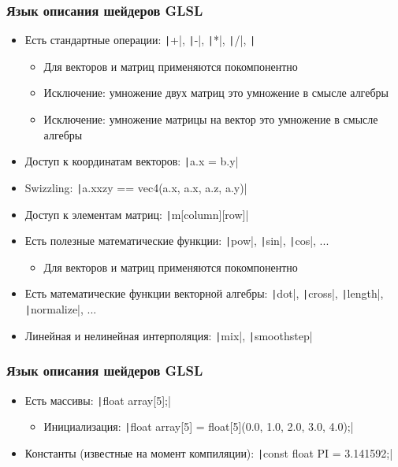 \documentclass[10pt]{beamer}
\begin{document}
\begin{frame}[fragile]
\frametitle{Язык описания шейдеров GLSL}
\begin{itemize}
\item Есть стандартные операции: \texttt|+|, \texttt|-|, \texttt|*|, \texttt|/|, \texttt|%
\pause
\begin{itemize}
\item Для векторов и матриц применяются покомпонентно
\pause
\item Исключение: умножение двух матриц это умножение в смысле алгебры
\pause
\item Исключение: умножение матрицы на вектор это умножение в смысле алгебры
\end{itemize}
\pause
\item Доступ к координатам векторов: \texttt|a.x = b.y|
\pause
\item Swizzling: \texttt|a.xxzy == vec4(a.x, a.x, a.z, a.y)|
\pause
\item Доступ к элементам матриц: \texttt|m[column][row]|
\pause
\item Есть полезные математические функции: \texttt|pow|, \texttt|sin|, \texttt|cos|, ...
\pause
\begin{itemize}
\item Для векторов и матриц применяются покомпонентно
\end{itemize}
\pause
\item Есть математические функции векторной алгебры: \texttt|dot|, \texttt|cross|, \texttt|length|, \texttt|normalize|, ...
\pause
\item Линейная и нелинейная интерполяция: \texttt|mix|, \texttt|smoothstep|
\end{itemize}
\end{frame}

\begin{frame}[fragile]
\frametitle{Язык описания шейдеров GLSL}
\begin{itemize}
\item Есть массивы: \texttt|float array[5];|
\pause
\begin{itemize}
\item Инициализация: \texttt|float array[5] = float[5](0.0, 1.0, 2.0, 3.0, 4.0);|
\end{itemize}
\pause
\item Константы (известные на момент компиляции): \texttt|const float PI = 3.141592;|
\end{itemize}
\end{frame}
\end{document}
